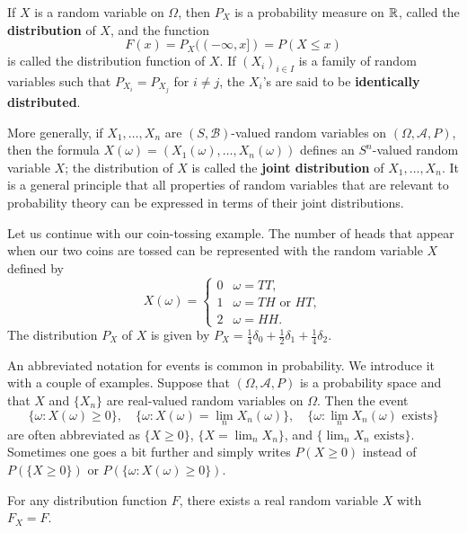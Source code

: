 If $X$ is a random variable on $\Omega$, then $P_X$ is a probability measure on $\mathbb{R}$, called the \textbf{distribution} of $X$, and the function
\[F(x)=P_X((-\infty,x])=P(X\leq x)\]
is called the distribution function of $X$. If $(X_i)_{i\in I}$ is a family of random variables such that $P_{X_i}=P_{X_j}$ for $i\neq j$, the $X_i$'s are said to be \textbf{identically distributed}.\par
More generally, if $X_1,\dots,X_n$ are $(S,\mathcal{B})$-valued random variables on $(\Omega,\mathcal{A},P)$, then the formula $X(\omega)=(X_1(\omega),\dots,X_n(\omega))$ defines an $S^n$-valued random variable $X$; the distribution of $X$ is called the \textbf{joint distribution} of $X_1,\dots,X_n$. It is a general principle that all properties of random variables that are relevant to probability theory can be expressed in terms of their joint distributions.
\begin{example}
Let us continue with our coin-tossing example. The number of heads that appear when our two coins are tossed can be represented with the random variable $X$ defined by
\[X(\omega)=\begin{cases}
0&\omega=TT,\\
1&\text{$\omega=TH$ or $HT$},\\
2&\omega=HH.
\end{cases}\]
The distribution $P_X$ of $X$ is given by $P_X=\frac{1}{4}\delta_0+\frac{1}{2}\delta_1+\frac{1}{4}\delta_2$.
\end{example}
An abbreviated notation for events is common in probability. We introduce it with a couple of examples. Suppose that $(\Omega,\mathcal{A},P)$ is a probability space and that $X$ and $\{X_n\}$ are real-valued random variables on $\Omega$. Then the event
\[\{\omega:X(\omega)\geq 0\},\quad \{\omega:X(\omega)=\lim_nX_n(\omega)\},\quad \{\omega:\lim_nX_n(\omega)\text{ exists}\}\]
are often abbreviated as $\{X\geq 0\}$, $\{X=\lim_nX_n\}$, and $\{\lim_nX_n\text{ exists}\}$. Sometimes one goes a bit further and simply writes $P(X\geq 0)$ instead of $P(\{X\geq 0\})$ or $P(\{\omega:X(\omega)\geq 0\})$.
\begin{theorem}
For any distribution function $F$, there exists a real random variable $X$ with $F_X=F$.
\end{theorem}
